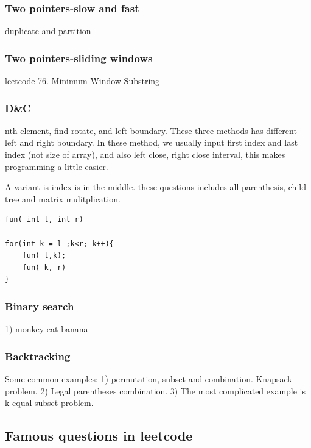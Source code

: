 \documentclass[a4paper,11pt,twoside]{book}
\begin{document}
\subsubsection{Two pointers-slow and fast}
	\par duplicate and partition

\subsubsection{Two pointers-sliding windows}
	\par leetcode 76. Minimum Window Substring

\subsubsection{D\&C}
	\par nth element, find rotate, and left boundary. These three methods has different left and right boundary.  In these method, we usually input first index and last index (not size of array), and also left close, right close interval, this makes programming a little easier. 

\par A variant is index is in the middle. these questions includes all parenthesis, child tree and matrix mulitplication.
\begin{lstlisting}
fun( int l, int r)

for(int k = l ;k<r; k++){
	fun( l,k);
	fun( k, r)
}				
\end{lstlisting}	

\subsubsection{Binary search}
\par 1) monkey eat banana 

\subsubsection{Backtracking}

\par Some common examples:  1) permutation, subset and combination. Knapsack problem. 2) Legal parentheses combination. 3) The most complicated example is k equal subset problem. 


\subsection{Famous questions in leetcode}
\end{document}
